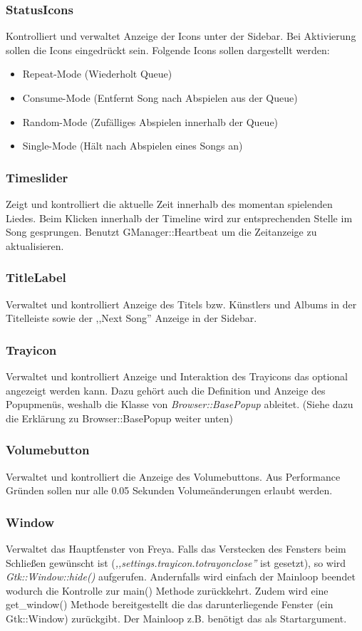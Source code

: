 \subsubsection{StatusIcons}
Kontrolliert und verwaltet Anzeige der Icons unter der Sidebar.
Bei Aktivierung sollen die Icons eingedrückt sein.
Folgende Icons sollen dargestellt werden:
\begin{itemize}
\item Repeat-Mode (Wiederholt Queue)
\item Consume-Mode (Entfernt Song nach Abspielen aus der Queue)
\item Random-Mode (Zufälliges Abspielen innerhalb der Queue)
\item Single-Mode (Hält nach Abspielen eines Songs an)
\end{itemize}

\subsubsection{Timeslider}
Zeigt und kontrolliert die aktuelle Zeit innerhalb des momentan spielenden Liedes.
Beim Klicken innerhalb der Timeline wird zur entsprechenden Stelle im Song gesprungen.
Benutzt GManager::Heartbeat um die Zeitanzeige zu aktualisieren.

\subsubsection{TitleLabel}
Verwaltet und kontrolliert Anzeige des Titels bzw. Künstlers und Albums in der Titelleiste sowie der ,,Next Song'' Anzeige in der Sidebar.

\subsubsection{Trayicon}
Verwaltet und kontrolliert Anzeige und Interaktion des Trayicons das optional angezeigt werden kann.
Dazu gehört auch die Definition und Anzeige des Popupmenüs, weshalb die Klasse von \textit{Browser::BasePopup} ableitet.
(Siehe dazu die Erklärung zu Browser::BasePopup weiter unten)

\subsubsection{Volumebutton}
Verwaltet und kontrolliert die Anzeige des Volumebuttons. Aus Performance Gründen sollen nur alle 0.05 Sekunden Volumeänderungen erlaubt werden.

\subsubsection{Window}
Verwaltet das Hauptfenster von Freya.
Falls das Verstecken des Fensters beim Schließen gewünscht ist (\emph{,,settings.trayicon.totrayonclose''} ist gesetzt),
so wird \emph{Gtk::Window::hide()} aufgerufen.
Andernfalls wird einfach der Mainloop beendet wodurch die Kontrolle zur main() Methode zurückkehrt.
Zudem wird eine get\_window() Methode bereitgestellt die das darunterliegende Fenster (ein Gtk::Window) zurückgibt.
Der Mainloop z.B. benötigt das als Startargument.
